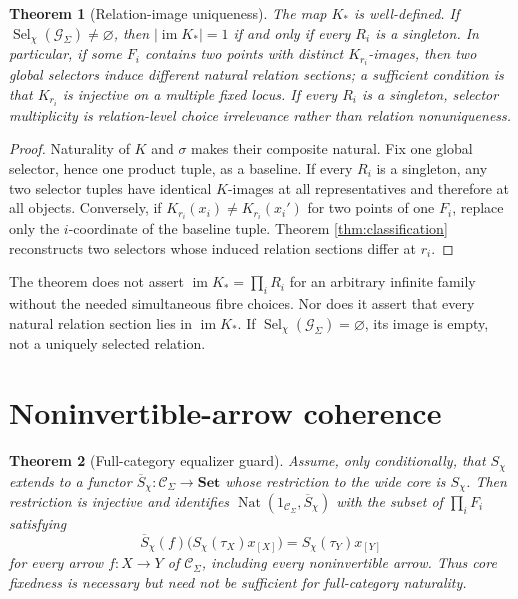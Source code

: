 \documentclass[11pt]{article}
\newtheorem{theorem}{Theorem}
\theoremstyle{definition}
\newcommand{\G}{\mathcal G_{\Sigma}}
\newcommand{\C}{\mathcal C_{\Sigma}}
\newcommand{\Sel}{\operatorname{Sel}_{\chi}}
\newcommand{\Nat}{\operatorname{Nat}}
\newcommand{\Img}{\operatorname{im}}
\begin{document}
\begin{theorem}[Relation-image uniqueness]
\label{thm:kimage}
The map \(K_*\) is well-defined. If \(\Sel(\G)\neq\varnothing\), then
\(\lvert\Img K_*\rvert=1\) if and only if every \(R_i\) is a singleton.
In particular, if some \(F_i\) contains two points with distinct
\(K_{r_i}\)-images, then two global selectors induce different natural
relation sections; a sufficient condition is that \(K_{r_i}\) is injective
on a multiple fixed locus. If every \(R_i\) is a singleton, selector
multiplicity is relation-level choice irrelevance rather than relation
nonuniqueness.
\end{theorem}

\begin{proof}
Naturality of \(K\) and \(\sigma\) makes their composite natural. Fix one
global selector, hence one product tuple, as a baseline. If every \(R_i\) is
a singleton, any two selector tuples have identical \(K\)-images at all
representatives and therefore at all objects. Conversely, if
\(K_{r_i}(x_i)\neq K_{r_i}(x_i')\) for two points of one \(F_i\), replace
only the \(i\)-coordinate of the baseline tuple. Theorem
\ref{thm:classification} reconstructs two selectors whose induced relation
sections differ at \(r_i\).
\end{proof}

The theorem does not assert
\(\Img K_*=\prod_iR_i\) for an arbitrary infinite family without the needed
simultaneous fibre choices. Nor does it assert that every natural relation
section lies in \(\Img K_*\). If \(\Sel(\G)=\varnothing\), its image is
empty, not a uniquely selected relation.

\section{Noninvertible-arrow coherence}

\begin{theorem}[Full-category equalizer guard]
\label{thm:equalizer}
Assume, only conditionally, that \(S_\chi\) extends to a functor
\(\overline S_\chi:\C\to\mathbf{Set}\) whose restriction to the wide core
is \(S_\chi\). Then restriction is injective and identifies
\(\Nat(1_{\C},\overline S_\chi)\) with the subset of
\(\prod_iF_i\) satisfying
\[
  \overline S_\chi(f)
  \bigl(S_\chi(\tau_X)x_{[X]}\bigr)
  =S_\chi(\tau_Y)x_{[Y]}
\]
for every arrow \(f:X\to Y\) of \(\C\), including every noninvertible
arrow. Thus core fixedness is necessary but need not be sufficient for
full-category naturality.
\end{theorem}
\end{document}
